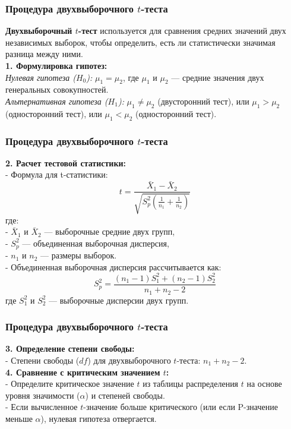 \documentclass[aspectratio=169]{beamer}
\begin{document}
\begin{frame}
\frametitle{Процедура двухвыборочного $t$-теста}
{\bf Двухвыборочный $t$-тест} используется для сравнения средних значений двух независимых выборок, чтобы определить, есть ли статистически значимая разница между ними.\\
{\bf 1. Формулировка гипотез:}\\
{\it Нулевая гипотеза ($H_0$):} \( \mu_1 = \mu_2 \), где \( \mu_1 \) и \( \mu_2 \) — средние значения двух генеральных совокупностей.\\
{\it Альтернативная гипотеза ($H_1$):} \( \mu_1 \ne \mu_2 \) (двусторонний тест), или \( \mu_1 > \mu_2 \) (односторонний тест), или \( \mu_1 < \mu_2 \) (односторонний тест).\\
\end{frame}

\begin{frame}
\frametitle{Процедура двухвыборочного $t$-теста}
{\bf 2. Расчет тестовой статистики:}\\
- Формула для t-статистики:
     \[
     t = \frac{\bar{X}_1 - \bar{X}_2}{\sqrt{S_p^2 \left(\frac{1}{n_1} + \frac{1}{n_2}\right)}}
     \]
где:\\
- \( \bar{X}_1 \) и \( \bar{X}_2 \) — выборочные средние двух групп,\\
- \( S_p^2 \) — объединенная выборочная дисперсия,\\
- \( n_1 \) и \( n_2 \) — размеры выборок.\\
- Объединенная выборочная дисперсия рассчитывается как:
     \[
     S_p^2 = \frac{(n_1 - 1)S_1^2 + (n_2 - 1)S_2^2}{n_1 + n_2 - 2}
     \]
где \( S_1^2 \) и \( S_2^2 \) — выборочные дисперсии двух групп.
\end{frame}

\begin{frame}
\frametitle{Процедура двухвыборочного $t$-теста}
{\bf 3. Определение степени свободы:}\\
- Степени свободы ($df$) для двухвыборочного $t$-теста: \( n_1 + n_2 - 2 \).\\
{\bf 4. Сравнение с критическим значением $t$:}\\
- Определите критическое значение $t$ из таблицы распределения $t$ на основе уровня значимости ($\alpha$) и степеней свободы.\\
- Если вычисленное $t$-значение больше критического (или если P-значение меньше $\alpha$), нулевая гипотеза отвергается.
\end{frame}
\end{document}
